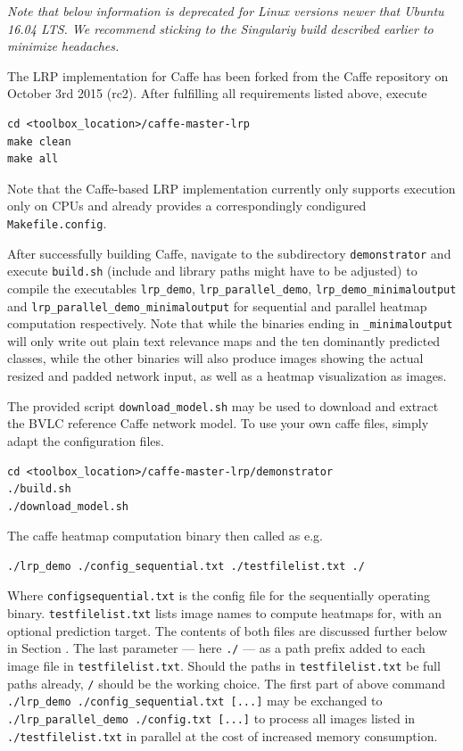 \documentclass[a4wide]{article}
\begin{document}
\emph{Note that below information is deprecated for Linux versions newer that Ubuntu 16.04 LTS. We recommend sticking to the Singulariy build described earlier to minimize headaches.}
\vspace{2mm}

The LRP implementation for Caffe has been forked from the Caffe repository on October 3rd 2015 (rc2). After fulfilling all requirements listed above, execute
\begin{Verbatim}[frame = single]
cd <toolbox_location>/caffe-master-lrp
make clean
make all
\end{Verbatim}
Note that the Caffe-based LRP implementation currently only supports execution only on CPUs and already provides a correspondingly condigured \texttt{Makefile.config}.

After successfully building Caffe, navigate to the subdirectory \texttt{demonstrator} and execute \texttt{build.sh} (include and library paths might have to be adjusted) to compile the executables \texttt{lrp\_demo}, \texttt{lrp\_parallel\_demo}, \texttt{lrp\_demo\_minimaloutput} and \texttt{lrp\_parallel\_demo\_minimaloutput} for sequential and parallel heatmap computation respectively. Note that while the binaries ending in \texttt{\_minimaloutput} will only write out plain text relevance maps and the ten dominantly predicted classes, while the other binaries will also produce images showing the actual resized and padded network input, as well as a heatmap visualization as images.

 The provided script \texttt{download\_model.sh} may be used to download and extract the  BVLC reference Caffe network model. To use your own caffe files, simply adapt the configuration files.
\begin{Verbatim}[frame = single]
cd <toolbox_location>/caffe-master-lrp/demonstrator
./build.sh
./download_model.sh
\end{Verbatim}
The caffe heatmap computation binary then called as e.g.
\begin{Verbatim}[frame = single]
./lrp_demo ./config_sequential.txt ./testfilelist.txt ./
\end{Verbatim}
Where \texttt{config\textunderscore sequential.txt} is the config file for the sequentially operating binary. \texttt{testfilelist.txt} lists image names to compute heatmaps for, with an optional prediction target. The contents of both files are discussed further below in Section . The last parameter --- here \texttt{./} --- as a path prefix added to each image file in \texttt{testfilelist.txt}. Should the paths in \texttt{testfilelist.txt} be full paths already, \texttt{/} should be the working choice.
The first part of above command \texttt{./lrp\_demo ./config\_sequential.txt [...]} may be exchanged to \texttt{./lrp\_parallel\_demo ./config.txt [...]} to process all images listed in \texttt{./testfilelist.txt} in parallel at the cost of increased memory consumption.
\end{document}
